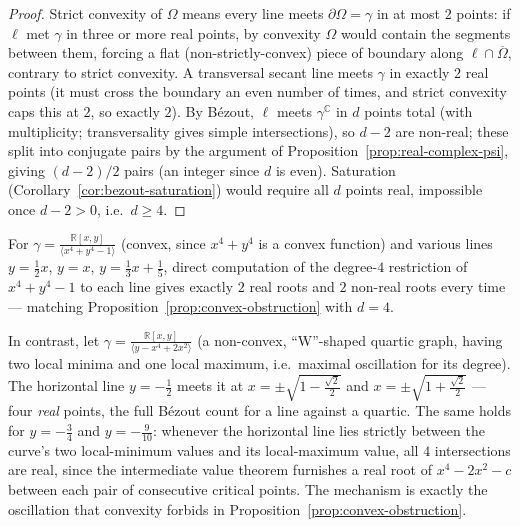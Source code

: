 \documentclass[article,11pt]{amsart} \numberwithin{equation}{section}
\numberwithin{equation}{section}
\begin{document}
{\begin{proof}
	Strict convexity of $\Omega$ means every line meets $\partial\Omega=\gamma$ in
	at most $2$ points: if $\ell$ met $\gamma$ in three or more real points, by
	convexity $\Omega$ would contain the segments between them, forcing a
	flat (non-strictly-convex) piece of boundary along $\ell\cap\overline\Omega$,
	contrary to strict convexity. A transversal secant line meets $\gamma$ in
	exactly $2$ real points (it must cross the boundary an even number of
	times, and strict convexity caps this at $2$, so exactly $2$). By Bézout,
	$\ell$ meets $\gamma^\mathbb C$ in $d$ points total (with multiplicity; transversality
	gives simple intersections), so $d-2$ are non-real; these split into
	conjugate pairs by the argument of Proposition~\ref{prop:real-complex-psi},
	giving $(d-2)/2$ pairs (an integer since $d$ is even). Saturation
	(Corollary~\ref{cor:bezout-saturation}) would require all $d$ points real,
	impossible once $d-2>0$, i.e.\ $d\ge4$.
\end{proof}

\begin{ex}
	For $\gamma=\frac{\mathbb R [x,y]}{\langle x^4+y^4-1\rangle}$ (convex, since $x^4+y^4$ is a convex function) and
	various lines $y=\tfrac12x$, $y=x$, $y=\tfrac13x+\tfrac15$, direct
	computation of the degree-$4$ restriction of $x^4+y^4-1$ to each line gives
	exactly $2$ real roots and $2$ non-real roots every time --- matching
	Proposition~\ref{prop:convex-obstruction} with $d=4$.
\end{ex}

\begin{ex}
	\label{ex:wiggly}
	In contrast, let $\gamma=\frac{\mathbb R [x,y]}{\langle y-x^4+2x^2\rangle}$ (a non-convex, ``W''-shaped quartic
	graph, having two local minima and one local maximum, i.e.\ maximal
	oscillation for its degree). The horizontal line $y=-\tfrac12$ meets it at
	$x=\pm\sqrt{1-\tfrac{\sqrt2}{2}}$ and $x=\pm\sqrt{1+\tfrac{\sqrt2}{2}}$ ---
	four \emph{real} points, the full Bézout count for a line against a
	quartic. The same holds for $y=-\tfrac34$ and $y=-\tfrac9{10}$: whenever
	the horizontal line lies strictly between the curve's two local-minimum
	values and its local-maximum value, all $4$ intersections are real, since
	the intermediate value theorem furnishes a real root of
	$x^4-2x^2-c$ between each pair of consecutive critical points. The
	mechanism is exactly the oscillation that convexity forbids in
	Proposition~\ref{prop:convex-obstruction}.
\end{ex}

}
\end{document}
